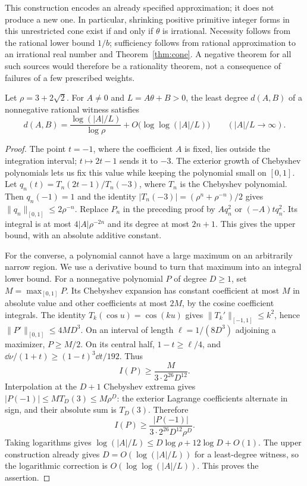 This construction encodes an already specified approximation; it does
not produce a new one. In particular, shrinking positive primitive
integer forms in this unrestricted cone exist if and only if $\theta$
is irrational. Necessity follows from the rational lower bound $1/b$;
sufficiency follows from rational approximation to an irrational real
number and Theorem~\ref{thm:cone}. A negative theorem for all such sources
would therefore be a rationality theorem, not a consequence of failures
of a few prescribed weights.

\begin{proposition}\label{prop:degree}
Let $\rho=3+2\sqrt2$. For $A\ne0$ and $L=A\theta+B>0$, the least
degree $d(A,B)$ of a nonnegative rational witness satisfies
\[
 d(A,B)=\frac{\log(|A|/L)}{\log\rho}
             +O\bigl(\log\log(|A|/L)\bigr)
 \qquad (|A|/L\longrightarrow\infty).
\]
\end{proposition}
\begin{proof}
The point $t=-1$, where the coefficient $A$ is fixed, lies outside
the integration interval; $t\mapsto2t-1$ sends it to $-3$.
The exterior growth of Chebyshev polynomials lets us fix this value
while keeping the polynomial small on $[0,1]$.
Let $q_n(t)=T_n(2t-1)/T_n(-3)$, where $T_n$ is the Chebyshev
polynomial. Then $q_n(-1)=1$ and
the identity $|T_n(-3)|=(\rho^n+\rho^{-n})/2$ gives
$\|q_n\|_{[0,1]}\leq 2\rho^{-n}$. Replace $P_n$ in the preceding
proof by $Aq_n^2$ or $(-A)tq_n^2$. Its integral is at most
$4|A|\rho^{-2n}$ and its degree at most $2n+1$. This gives the upper
bound, with an absolute additive constant.

For the converse, a polynomial cannot have a large maximum on an
arbitrarily narrow region. We use a derivative bound to turn that
maximum into an integral lower bound. For a nonnegative polynomial
$P$ of degree $D\geq1$, set $M=\max_{[0,1]}P$.
Its Chebyshev expansion has constant coefficient at most $M$ in absolute
value and other coefficients at most $2M$, by the cosine coefficient
integrals. The identity $T_k(\cos u)=\cos(ku)$ gives
$\|T_k'\|_{[-1,1]}\leq k^2$, hence
$\|P'\|_{[0,1]}\leq4MD^3$. On an interval of length
$\ell=1/(8D^3)$ adjoining a maximizer, $P\geq M/2$.
On its central half, $1-t\geq\ell/4$, and
$\dd\nu/(1+t)\geq(1-t)^3\dd t/192$. Thus
\[
 I(P)\geq\frac{M}{3\cdot2^{26}D^{12}}.
\]
Interpolation at the $D+1$ Chebyshev extrema gives
$|P(-1)|\leq M T_D(3)\leq M\rho^D$: the exterior Lagrange
coefficients alternate in sign, and their absolute sum is $T_D(3)$.
Therefore
\begin{equation}\label{eq:cone-lower}
 I(P)\geq\frac{|P(-1)|}{3\cdot2^{26}D^{12}\rho^D}.
\end{equation}
Taking logarithms gives
$\log(|A|/L)\leq D\log\rho+12\log D+O(1)$.
The upper construction already gives $D=O(\log(|A|/L))$ for a
least-degree witness, so the logarithmic correction is
$O(\log\log(|A|/L))$. This proves the assertion.
\end{proof}

